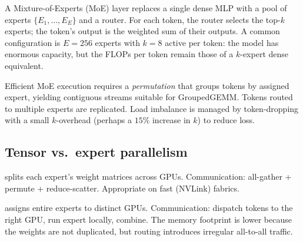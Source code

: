 \documentclass[11pt,a4paper]{article}
\theoremstyle{definition}
\theoremstyle{remark}
\theoremstyle{plain}
\begin{document}
A Mixture-of-Experts (MoE) layer replaces a single dense MLP with a pool of experts $\{E_1, \ldots, E_E\}$ and a router. For each token, the router selects the top-$k$ experts; the token's output is the weighted sum of their outputs. A common configuration is $E = 256$ experts with $k = 8$ active per token: the model has enormous capacity, but the FLOPs per token remain those of a $k$-expert dense equivalent.

\begin{center}
\end{center}

Efficient MoE execution requires a \emph{permutation} that groups tokens by assigned expert, yielding contiguous streams suitable for GroupedGEMM. Tokens routed to multiple experts are replicated. Load imbalance is managed by token-dropping with a small $k$-overhead (perhaps a $15\%$ increase in $k$) to reduce loss.

\subsection{Tensor vs.\ expert parallelism}

\begin{description}[leftmargin=1.5em,itemsep=0.3em]
    \item[Tensor Parallelism (TP)] splits each expert's weight matrices across GPUs. Communication: all-gather + permute + reduce-scatter. Appropriate on fast (NVLink) fabrics.
    \item[Expert Parallelism (EP)] assigns entire experts to distinct GPUs. Communication: dispatch tokens to the right GPU, run expert locally, combine. The memory footprint is lower because the weights are not duplicated, but routing introduces irregular all-to-all traffic.
\end{description}
\end{document}
